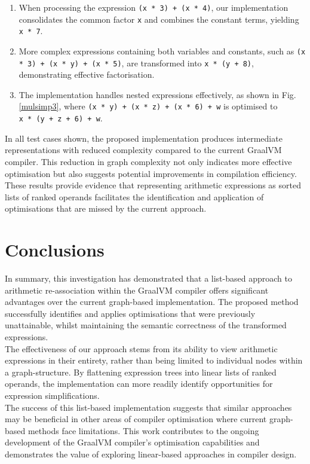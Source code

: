 \documentclass[12pt,openany,a4paper]{book}
\newcommand{\fig}[1]  {Fig.\,\ref{#1}}		%
\begin{document}
\begin{enumerate}
    \item{When processing the expression \verb|(x * 3) + (x * 4)|, our
        implementation consolidates the common factor \verb|x| and combines
        the constant terms, yielding \verb|x * 7|.}
    \item{More complex expressions containing both variables and constants,
        such as \verb|(x * 3) + (x * y) + (x * 5)|, are transformed into
        \verb|x * (y + 8)|, demonstrating effective factorisation.}
    \item{The implementation handles nested expressions effectively, as
        shown in \fig{mulsimp3}, where \verb|(x * y) + (x * z) + (x * 6) + w|
        is optimised to \\ \verb|x * (y + z + 6) + w|.}
\end{enumerate}

In all test cases shown, the proposed implementation produces intermediate
representations with reduced complexity compared to the current GraalVM
compiler. This reduction in graph complexity not only indicates more effective
optimisation but also suggests potential improvements in compilation
efficiency. These results provide evidence that representing arithmetic
expressions as sorted lists of ranked operands facilitates the identification
and application of optimisations that are missed by the current approach.

\chapter{Conclusions}
\label{conclusion}

In summary, this investigation has demonstrated that a list-based approach to
arithmetic re-association within the GraalVM compiler offers significant
advantages over the current graph-based implementation. The proposed method
successfully identifies and applies optimisations that were previously
unattainable, whilst maintaining the semantic correctness of the transformed
expressions. \\
The effectiveness of our approach stems from its ability to view arithmetic
expressions in their entirety, rather than being limited to individual nodes
within a graph-structure. By flattening expression trees into linear lists
of ranked operands, the implementation can more readily identify
opportunities for expression simplifications. \\
The success of this list-based implementation suggests that similar approaches
may be beneficial in other areas of compiler optimisation where current
graph-based methods face limitations. This work contributes to the 
ongoing development of the GraalVM compiler's optimisation capabilities
and demonstrates the value of exploring linear-based approaches in
compiler design.
\end{document}
